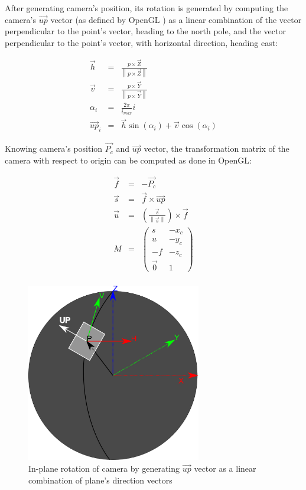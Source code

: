 After generating camera's position, its rotation is generated by computing the
camera's $\vec{up}$ vector (as defined by OpenGL \cite{opengl-book}) as a linear
combination of the vector perpendicular to the point's vector, heading to the
north pole, and the vector perpendicular to the point's vector, with horizontal
direction, heading east:

\begin{equation}
  \begin{array}{ccc}
  \vec{h} & = & \frac{ p  \times \vec{Z}}{\left\lVert p  \times \vec{Z}
  \right\rVert} \\
  \vec{v} & = & \frac{ p  \times \vec{Y}}{\left\lVert p  \times \vec{Y}
  \right\rVert} \\
  \alpha_i & = & \frac{2\pi}{i_{max}} i \\
  \vec{up}_i & = & \vec{h} \sin(\alpha_i) + \vec{v} \cos (\alpha_i)
  \end{array}
\end{equation}

Knowing camera's position $\vec{P_c}$ and $\vec{up}$ vector, the transformation matrix of
the camera with respect to origin can be computed as done in OpenGL:

\begin{equation}
  \begin{array}{ccc}
  \vec{f} & = & -\vec{P_c} \\
  \vec{s} & = & \vec{f} \times \vec{up} \\ 
  \vec{u} & = & \left( \frac{\vec{s} }{\left\lVert \vec{s}\right\rVert} 
  \right) \times \vec{f} \\
  M & = & \left(
  \begin{array}{cc}
    s & -x_c \\
    u & -y_c \\
    -f & -z_c  \\
    \vec{0} & 1
  \end{array} 
  \right) \\
  \end{array}
\end{equation}

\begin{figure}[htbp]
\centering
\includegraphics[width=3in]{./Graphics/up_vector}
\caption{In-plane rotation of camera by generating $\vec{up}$ vector as a linear
combination of plane's direction vectors \label{fig:up_vector}}
\end{figure}

